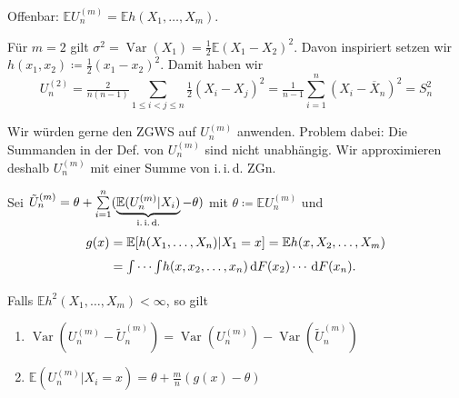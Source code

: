 \documentclass{cheat-sheet}
\newcommand{\E}{\mathbb{E}} %
\newcommand{\iid}{i.\,i.\,d.} %
\DeclareMathOperator{\var}{Var} %
\begin{document}
\begin{bem}
  Offenbar: $\E U_n^{(m)} = \E h(X_1, \ldots, X_m)$.
\end{bem}

\begin{bsp}
  Für $m=2$ gilt $\sigma^2 = \var(X_1) = \tfrac{1}{2} \E (X_1 - X_2)^2$.
  Davon inspiriert setzen wir $h(x_1, x_2) \coloneqq \tfrac{1}{2}(x_1 - x_2)^2$.
  Damit haben wir
  \[
    U_n^{(2)} = \tfrac{2}{n (n-1)} \sum_{1 \leq i < j \leq n} \tfrac{1}{2} (X_i - X_j)^2
    = \tfrac{1}{n-1} \sum_{i=1}^n (X_i - \overline{X}_n)^2 = S_n^2
  \]
\end{bsp}

\begin{ziel}
  Wir würden gerne den ZGWS auf $U_n^{(m)}$ anwenden.
  Problem dabei: Die Summanden in der Def. von $U_n^{(m)}$ sind nicht unabhängig.
  Wir approximieren deshalb $U_n^{(m)}$ mit einer Summe von \iid{} ZGn.
\end{ziel}

\begin{lem}
  Sei \enspace
  $\tilde{U}_n^{(m)} = \theta + \sum_{i=1}^n (\underbrace{\E(U_n^{(m)} | X_i)}_{\text{\iid{}}} - \theta)$ \enspace
  mit $\theta \coloneqq \E U_n^{(m)}$ und
  \begin{align*}
    g(x) & = \E[h(X_1, \ldots, X_n) | X_1 = x ] = \E h(x, X_2, \ldots, X_m) \\
    & = \Int{}{}{\cdots \Int{}{}{h(x, x_2, \ldots, x_n)}{F(x_2)} \cdots}{F(x_n)}.
  \end{align*}
  Falls $\E h^2(X_1, \ldots, X_m) < \infty$, so gilt
  \begin{enumerate}[label=(\arabic*), itemindent=6pt]
    \item $\var(U_n^{(m)} - \tilde{U}_n^{(m)}) = \var(U_n^{(m)}) - \var(\tilde{U}_n^{(m)})$
    \item $\E (U_n^{(m)} | X_i = x) = \theta + \tfrac{m}{n} (g(x) - \theta)$
  \end{enumerate}
\end{lem}
\end{document}
